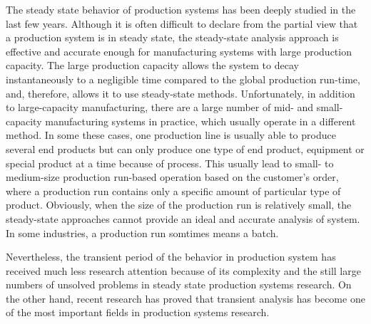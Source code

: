 The steady state behavior of production systems has been deeply studied in the last few years. Although it is often difficult to declare from the partial view that a production system is in steady state, the steady-state analysis approach is effective and accurate enough for manufacturing systems with large production capacity. The large production capacity allows the system to decay instantaneously to a negligible time compared to the global production run-time, and, therefore, allows it to use steady-state methods. Unfortunately, in addition to large-capacity manufacturing, there are a large number of mid- and small-capacity manufacturing systems in practice, which usually operate in a different method. In some these cases, one production line is usually able to produce several end products but can only produce one type of end product, equipment or special product at a time because of process. This usually lead to small- to medium-size production run-based operation based on the customer's order, where a production run contains only a specific amount of particular type of product. Obviously, when the size of the production run is relatively small, the steady-state approaches cannot provide an ideal and accurate analysis of system. In some industries, a production run somtimes means a batch.

Nevertheless, the transient period of the behavior in production system has received much less research attention because of its complexity and the still large numbers of unsolved problems in steady state production systems research. On the other hand, recent research \cite{li2009throughput} has proved that transient analysis has become one of the most important fields in production systems research. 

